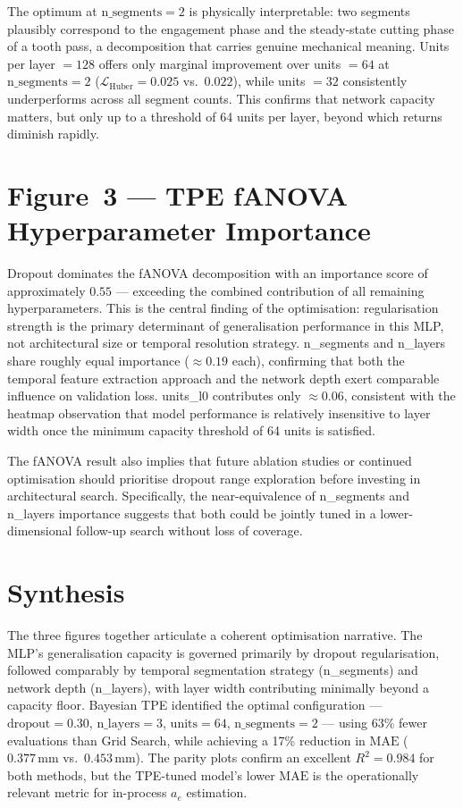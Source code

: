 \documentclass[11pt, a4paper]{article}
\newcommand{\Lhuber}{\mathcal{L}_{\text{Huber}}}
\newcommand{\ae}{a_e}
\newcommand{\MAE}{\text{MAE}}
\newcommand{\Rtwo}{R^2}
\begin{document}
The optimum at $\text{n\_segments} = 2$ is physically interpretable: two segments
plausibly correspond to the engagement phase and the steady-state cutting phase of
a tooth pass, a decomposition that carries genuine mechanical meaning.
Units per layer $= 128$ offers only marginal improvement over units $= 64$ at
$\text{n\_segments} = 2$ ($\Lhuber = 0.025$ vs.\ $0.022$), while units $= 32$
consistently underperforms across all segment counts.
This confirms that network capacity matters, but only up to a threshold of
64 units per layer, beyond which returns diminish rapidly.

\section{Figure~3 — TPE fANOVA Hyperparameter Importance}
\label{sec:fig3}

Dropout dominates the fANOVA decomposition with an importance score of
approximately $0.55$ — exceeding the combined contribution of all remaining
hyperparameters.
This is the central finding of the optimisation: regularisation strength is the
primary determinant of generalisation performance in this MLP, not architectural
size or temporal resolution strategy.
n\_segments and n\_layers share roughly equal importance ($\approx 0.19$ each),
confirming that both the temporal feature extraction approach and the network
depth exert comparable influence on validation loss.
units\_l0 contributes only $\approx 0.06$, consistent with the heatmap observation
that model performance is relatively insensitive to layer width once the minimum
capacity threshold of 64 units is satisfied.

The fANOVA result also implies that future ablation studies or continued
optimisation should prioritise dropout range exploration before investing in
architectural search.
Specifically, the near-equivalence of n\_segments and n\_layers importance suggests
that both could be jointly tuned in a lower-dimensional follow-up search without
loss of coverage.

\section{Synthesis}
\label{sec:synthesis}

The three figures together articulate a coherent optimisation narrative.
The MLP's generalisation capacity is governed primarily by dropout regularisation,
followed comparably by temporal segmentation strategy (n\_segments) and network
depth (n\_layers), with layer width contributing minimally beyond a capacity floor.
Bayesian TPE identified the optimal configuration —
$\text{dropout} = 0.30$, $\text{n\_layers} = 3$, $\text{units} = 64$,
$\text{n\_segments} = 2$ — using 63\% fewer evaluations than Grid Search, while
achieving a 17\% reduction in $\MAE$ ($0.377\,\text{mm}$ vs.\ $0.453\,\text{mm}$).
The parity plots confirm an excellent $\Rtwo = 0.984$ for both methods, but the
TPE-tuned model's lower $\MAE$ is the operationally relevant metric for
in-process $\ae$ estimation.
\end{document}

